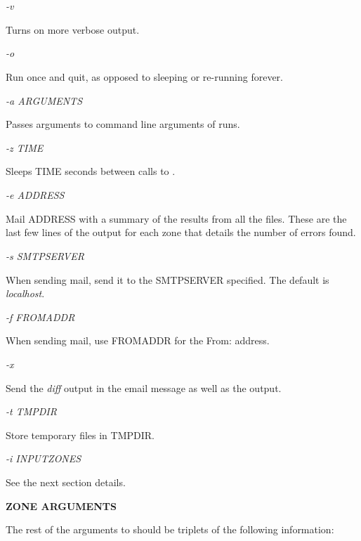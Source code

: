 \begin{description}

\item {\it -v}\verb" "

Turns on more verbose output.

\item {\it -o}\verb" "

Run once and quit, as opposed to sleeping or re-running forever.

\item {\it -a ARGUMENTS}\verb" "

Passes arguments to command line arguments of  runs.

\item {\it -z TIME}\verb" "

Sleeps TIME seconds between calls to .

\item {\it -e ADDRESS}\verb" "

Mail ADDRESS with a summary of the results from all the files.
These are the last few lines of the  output for each zone that
details the number of errors found.

\item {\it -s SMTPSERVER}\verb" "

When sending mail, send it to the SMTPSERVER specified.  The default
is {\it localhost}.

\item {\it -f FROMADDR}\verb" "

When sending mail, use FROMADDR for the From: address.

\item {\it -x}\verb" "

Send the {\it diff} output in the email message as well as the
 output.

\item {\it -t TMPDIR}\verb" "

Store temporary files in TMPDIR.

\item {\it -i INPUTZONES}\verb" "

See the next section details.

\end{description}

{\bf ZONE ARGUMENTS}

The rest of the arguments to  should be triplets of the
following information:

